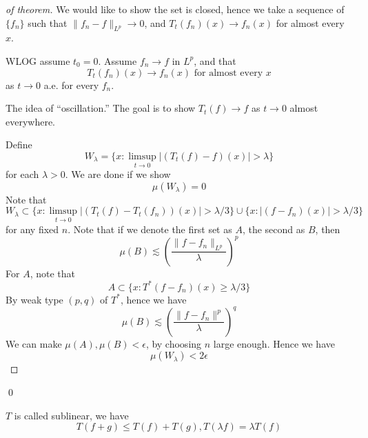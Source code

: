\begin{proof}[of theorem]
    We would like to show the set is closed, hence we take a sequence of $\{f_n\}$ such that $\|f_n-f\|_{L^p}\to 0$, and $T_t(f_n)(x)\to f_n(x)$ for almost every $x$. 

    WLOG assume $t_0=0$. Assume $f_n\to f$ in $L^p$, and that
    \begin{equation*}
        T_t(f_n)(x)\to f_n(x) \text{ for almost every } x
    \end{equation*}
    as $t\to 0$ a.e. for every $f_n$.

    The idea of ``oscillation.'' The goal is to show $T_t(f)\to f$ as $t\to 0$ almost everywhere.

    Define
    \begin{equation*}
        W_\lambda=\{x: \limsup_{t\to 0}|(T_t(f)-f)(x)|>\lambda \}
    \end{equation*}
    for each $\lambda>0$. We are done if we show 
    \begin{equation*}
        \mu(W_\lambda)=0
    \end{equation*}
    Note that 
    \begin{equation*}
        W_\lambda\subset\{x:\limsup_{t\to 0}|(T_t(f)-T_t(f_n))(x)|>\lambda/3\}\cup \{x: |(f-f_n)(x)|>\lambda/3\}
    \end{equation*}
    for any fixed $n$. Note that if we denote the first set as $A$, the second as $B$, then 
    \begin{equation*}
        \mu(B)\lesssim \left(\frac{\|f-f_n\|_{L^p}}{\lambda} \right)^p
    \end{equation*}
    For $A$, note that 
    \begin{equation*}
        A\subset \{x: T^*(f-f_n)(x)\geq\lambda/3\}
    \end{equation*}
    By weak type $(p,q)$ of $T^*$, hence we have
    \begin{equation*}
        \mu(B)\lesssim \left(\frac{\|f-f_n\|^p}{\lambda} \right)^q
    \end{equation*}
    We can make $\mu(A), \mu(B)<\epsilon$, by choosing $n$ large enough. Hence we have
    \begin{equation*}
        \mu(W_\lambda)<2\epsilon
    \end{equation*}
\end{proof}
\qed

\begin{definition}
    $T$ is called sublinear, we have 
    \begin{equation*}
        T(f+g)\leq T(f)+T(g), T(\lambda f)=\lambda T(f)
    \end{equation*}
\end{definition}

